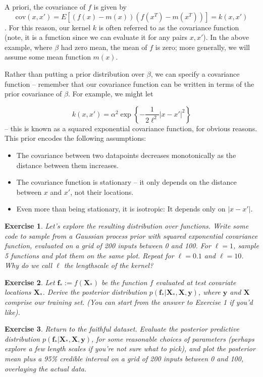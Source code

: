 \documentclass[twoside]{article}
\newcounter{lecnum}
\newtheorem{exercise}{Exercise}[lecnum]
\newcommand\cov{\mbox{cov}}
\begin{document}
A priori, the  covariance of $f$ is given by $$\cov(x,x') = E[(f(x)-m(x))(f(x^T)-m(x^T))] = k(x,x')$$. For this reason, our kernel $k$ is often referred to as the covariance function (note, it is a function since we can evaluate it for any pairs $x,x'$). In the above example, where $\beta$ had zero mean, the mean of $f$ is zero; more generally, we will assume some mean function $m(x)$.

Rather than putting a prior distribution over $\beta$, we can specify a covariance function -- remember that our covariance function can be written in terms of the prior covariance of $\beta$.  For example, we might let

$$k(x,x') = \alpha^2\exp\left\{-\frac{1}{2\ell^2}|x-x'|^2\right\}$$
 -- this is known as a squared exponential covariance function, for obvious reasons. This prior encodes the following assumptions:
\begin{itemize}
\item The covariance between two datapoints decreases monotonically as the distance between them increases.
\item The covariance function is stationary -- it only depends on the distance between $x$ and $x'$, not their locations.
\item Even more than being stationary, it is isotropic: It depends only on $|x-x'|$.
\end{itemize}

\begin{exercise}
  Let's explore the resulting distribution over functions. Write some code to sample from a Gaussian process prior with squared exponential covariance function, evaluated on a grid of 200 inputs between 0 and 100. For $\ell=1$, sample 5 functions and plot them on the same plot. Repeat for $\ell=0.1$ and $\ell=10$. Why do we call $\ell$ the lengthscale of the kernel?
\end{exercise}

\begin{exercise}
  Let $\mathbf{f}_*:=f(\mathbf{X}_*)$ be the function $f$ evaluated at test covariate locations $\mathbf{X}_*$. Derive the posterior distribution $p(\mathbf{f}_*|\mathbf{X}_*,\mathbf{X},\mathbf{y})$, where $\mathbf{y}$ and $\mathbf{X}$ comprise our training set. (You can start from the answer to Exercise 1 if you'd like).

\end{exercise}
\begin{exercise}
Return to the faithful dataset. Evaluate the posterior predictive distribution 
$p(\mathbf{f}_*|\mathbf{X}_*,\mathbf{X},\mathbf{y})$, for some reasonable choices of parameters (perhaps explore a few length scales if you're not sure what to pick), and plot the posterior mean plus a 95\% credible interval on a grid of 200 inputs between 0 and 100, overlaying the actual data.
\end{exercise}
\end{document}

